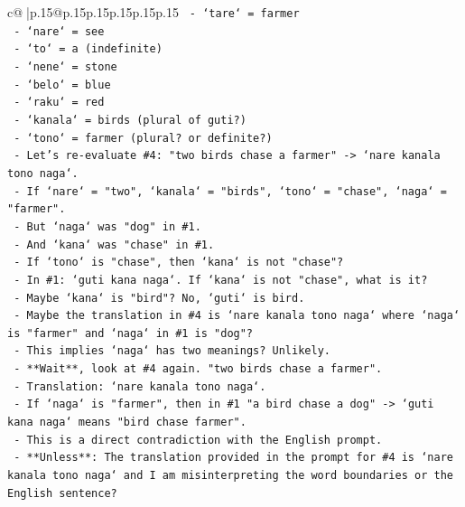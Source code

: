 \documentclass{article}
\begin{document}
{\begin{supertabular}{c@{$\;$}|p{.15\linewidth}@{}p{.15\linewidth}p{.15\linewidth}p{.15\linewidth}p{.15\linewidth}p{.15\linewidth}}
{{{\texttt{               {-} `tare` = farmer} \\
\texttt{               {-} `nare` = see} \\
\texttt{               {-} `to` = a (indefinite)} \\
\texttt{               {-} `nene` = stone} \\
\texttt{               {-} `belo` = blue} \\
\texttt{               {-} `raku` = red} \\
\texttt{               {-} `kanala` = birds (plural of guti?)} \\
\texttt{               {-} `tono` = farmer (plural? or definite?)} \\
\texttt{             {-} Let's re{-}evaluate \#4: "two birds chase a farmer" {-}> `nare kanala tono naga`.} \\
\texttt{               {-} If `nare` = "two", `kanala` = "birds", `tono` = "chase", `naga` = "farmer".} \\
\texttt{               {-} But `naga` was "dog" in \#1.} \\
\texttt{               {-} And `kana` was "chase" in \#1.} \\
\texttt{               {-} If `tono` is "chase", then `kana` is not "chase"?} \\
\texttt{               {-} In \#1: `guti kana naga`. If `kana` is not "chase", what is it?} \\
\texttt{               {-} Maybe `kana` is "bird"? No, `guti` is bird.} \\
\texttt{               {-} Maybe the translation in \#4 is `nare kanala tono naga` where `naga` is "farmer" and `naga` in \#1 is "dog"?} \\
\texttt{               {-} This implies `naga` has two meanings? Unlikely.} \\
\texttt{               {-} **Wait**, look at \#4 again. "two birds chase a farmer".} \\
\texttt{               {-} Translation: `nare kanala tono naga`.} \\
\texttt{               {-} If `naga` is "farmer", then in \#1 "a bird chase a dog" {-}> `guti kana naga` means "bird chase farmer".} \\
\texttt{               {-} This is a direct contradiction with the English prompt.} \\
\texttt{               {-} **Unless**: The translation provided in the prompt for \#4 is `nare kanala tono naga` and I am misinterpreting the word boundaries or the English sentence?} \\
}}}
\end{supertabular}}
\end{document}
